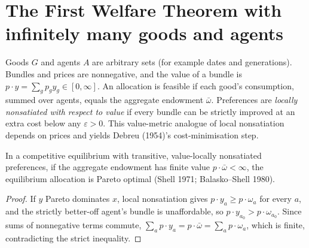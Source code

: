 \section{The First Welfare Theorem with infinitely many goods and agents}
\label{sec:infinite_welfare}

Goods $G$ and agents $A$ are arbitrary sets (for example dates and generations). Bundles and prices are nonnegative,
and the value of a bundle is $p \cdot y = \sum_g p_g y_g \in [0, \infty]$. An allocation is feasible if each good's
consumption, summed over agents, equals the aggregate endowment $\bar\omega$. Preferences are \emph{locally nonsatiated
with respect to value} if every bundle can be strictly improved at an extra cost below any $\varepsilon > 0$. This
value-metric analogue of local nonsatiation depends on prices and yields Debreu (1954)'s cost-minimisation step.

\begin{theorem}
\label{thm:infinite_fwt}
\leanok
In a competitive equilibrium with transitive, value-locally nonsatiated preferences, if the aggregate endowment has finite
value $p \cdot \bar\omega < \infty$, the equilibrium allocation is Pareto optimal (Shell 1971; Balasko--Shell 1980).
\end{theorem}
\begin{proof}
\leanok
If $y$ Pareto dominates $x$, local nonsatiation gives $p \cdot y_a \ge p \cdot \omega_a$ for every $a$, and the strictly
better-off agent's bundle is unaffordable, so $p \cdot y_{a_0} > p \cdot \omega_{a_0}$. Since sums of nonnegative terms
commute, $\sum_a p \cdot y_a = p \cdot \bar\omega = \sum_a p \cdot \omega_a$, which is finite, contradicting the strict
inequality.
\end{proof}

